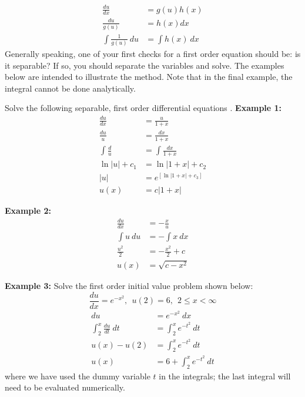 \begin{align*}
\frac{du}{dx} &= g(u)h(x) \\
\frac{du}{g(u)} &= h(x) dx \\
\int \frac{1}{g(u)} \ du &= \int h(x) \ dx 
\end{align*}
Generally speaking, one of your first checks for a first order equation should be: is it separable?  If so, you should separate the variables and solve.  The examples below are intended to illustrate the method.  Note that in the final example, the integral cannot be done analytically.
\begin{example}[h!]
Solve the following separable, first order differential equations
.
\textbf{Example 1:} 
\begin{align*}
\frac{du}{dx} &= \frac{u}{1 + x} \\
\frac{du}{u} &= \frac{dx}{1+x} \\
\int \frac{d}{u} &= \int \frac{dx}{1+x} \\
\ln{|u|} + c_1 &= \ln{|1+x|} + c_2 \\
|u| &= e^{\left[\ln{|1+x|} + c_3\right]}\\
    u(x)&= c|1+x|
\end{align*}

\end{example}

\begin{example}[h!]
\textbf{Example 2:}
\begin{align*}
\frac{du}{dx} &= -\frac{x}{u} \\
\int u \ du &= -\int x \ dx \\
\frac{u^2}{2} &= -\frac{x^2}{2}+c \\
u(x) &= \sqrt{c - x^2}
\end{align*}
\end{example}

\begin{example}[h!]
\textbf{Example 3:}
Solve the first order initial value problem shown below:
\begin{equation}
\frac{du}{dx} = e^{-x^2}, \ \ u(2) = 6, \ \ 2 \le x < \infty
\end{equation}
\begin{align*}
du &= e^{-x^2}\ dx \\
\int_2^{x} \frac{du}{dt} \ dt &= \int_{2}^{x} e^{-t^2} \ dt \\
u(x) - u(2) &= \int_{2}^{x} e^{-t^2} \ dt \\
u(x) &= 6 + \int_{2}^{x} e^{-t^2} \ dt
\end{align*}
where we have used the dummy variable $t$ in the integrals; the last integral will need to be evaluated numerically.

\end{example}
